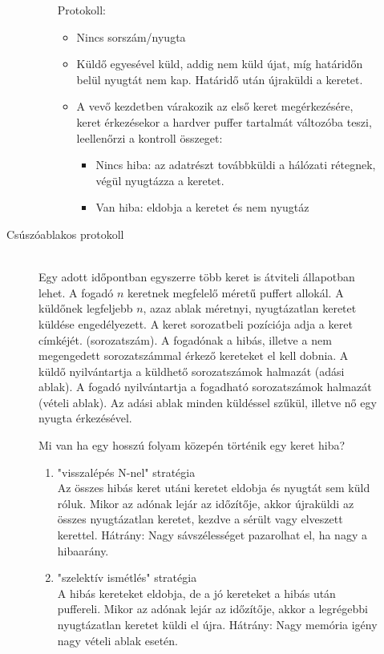 \documentclass[margin=0px]{article}
\begin{document}
\begin{description}
\begin{description}
\begin{itemize}
                          Protokoll:
                          \begin{itemize}
                              \item Nincs sorszám/nyugta
                              \item Küldő egyesével küld, addig nem küld újat, míg határidőn belül nyugtát nem kap. Határidő után újraküldi a keretet.
                              \item A vevő kezdetben várakozik az első keret megérkezésére, keret érkezésekor a hardver puffer tartalmát változóba teszi, leellenőrzi a kontroll összeget:
                                    \begin{itemize}
                                        \item Nincs hiba: az adatrészt továbbküldi a hálózati rétegnek, végül nyugtázza a keretet.
                                        \item Van hiba: eldobja a keretet és nem nyugtáz
                                    \end{itemize}
                          \end{itemize}
                \end{itemize}
            \item[Csúszóablakos protokoll] \hfill \\
                Egy adott időpontban egyszerre több keret is átviteli állapotban lehet. A fogadó $n$ keretnek megfelelő méretű puffert allokál. A küldőnek legfeljebb $n$, azaz ablak méretnyi, nyugtázatlan keretet küldése engedélyezett. A keret sorozatbeli pozíciója adja a keret címkéjét. (sorozatszám).
                A fogadónak a hibás, illetve a nem megengedett sorozatszámmal érkező kereteket el kell dobnia. A küldő nyilvántartja a küldhető sorozatszámok halmazát (adási ablak). A fogadó nyilvántartja a fogadható sorozatszámok halmazát (vételi ablak). Az adási ablak minden küldéssel szűkül, illetve nő egy nyugta érkezésével.

                Mi van ha egy hosszú folyam közepén történik egy keret hiba?
                \begin{enumerate}
                    \item "visszalépés N-nel" stratégia\\
                          Az összes hibás keret utáni keretet eldobja és nyugtát sem küld róluk. Mikor az adónak lejár az időzítője, akkor újraküldi az összes nyugtázatlan keretet, kezdve a sérült vagy elveszett kerettel. Hátrány: Nagy sávszélességet pazarolhat el, ha nagy a hibaarány.
                    \item "szelektív ismétlés" stratégia \\
                          A hibás kereteket eldobja, de a jó kereteket a hibás után puffereli. Mikor az adónak lejár az időzítője, akkor a legrégebbi nyugtázatlan keretet küldi el újra. Hátrány: Nagy memória igény nagy vételi ablak esetén.
                \end{enumerate}


\end{description}
\end{description}
\end{document}
